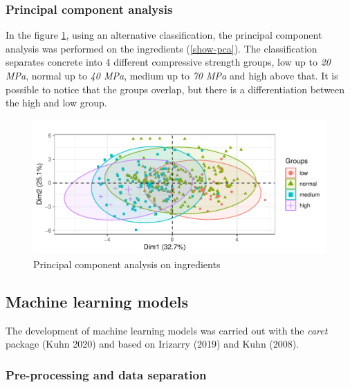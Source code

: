 \documentclass[
]{article}
\begin{document}
\hypertarget{principal-component-analysis}{%
\subsubsection{Principal component
analysis}\label{principal-component-analysis}}

In the figure \ref{fig:pca}, using an alternative classification, the
principal component analysis was performed on the ingredients
(\ref{show-pca}). The classification separates concrete into 4 different
compressive strength groups, low up to \emph{20 MPa}, normal up to
\emph{40 MPa}, medium up to \emph{70 MPa} and high above that. It is
possible to notice that the groups overlap, but there is a
differentiation between the high and low group.

\begin{figure}

{\centering \includegraphics{paper_EN_files/figure-latex/pca-1} 

}

\caption{Principal component analysis on ingredients}\label{fig:pca}
\end{figure}

\hypertarget{machine-learning-models}{%
\subsection{Machine learning models}\label{machine-learning-models}}

The development of machine learning models was carried out with the
\emph{caret} package (Kuhn 2020) and based on Irizarry (2019) and Kuhn
(2008).

\hypertarget{pre-processing-and-data-separation}{%
\subsubsection{Pre-processing and data
separation}\label{pre-processing-and-data-separation}}
\end{document}
